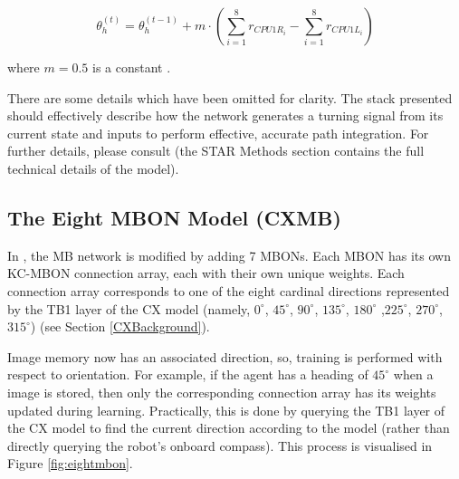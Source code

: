 \documentclass[a4paper,11pt,twoside,openright]{article}
\begin{document}
\begin{equation}
  \theta_h^{(t)} = \theta_h^{(t - 1)} +
  m \cdot (\sum_{i = 1}^{8} r_{CPU1R_{i}} - \sum_{i = 1}^{8} r_{CPU1L_{i}})
\end{equation}

where $m = 0.5$ is a constant \cite{Stone2017}.
\newline
\par

There are some details which have been omitted for clarity. The stack presented
should effectively describe how the network generates a turning signal from its
current state and inputs to perform effective, accurate path integration. For
further details, please consult \cite{Stone2017} (the STAR Methods section
contains the full technical details of the model).

\subsection{ The Eight MBON Model (CXMB) } \label{CXMBBackground}
In \cite{Zhang2017}, the MB network is modified by adding 7 MBONs. Each MBON has
its own KC-MBON connection array, each with their own unique weights. Each
connection array corresponds to one of the eight cardinal directions represented
by the TB1 layer of the CX model (namely, $0^{\circ}$, $45^{\circ}$,
$90^{\circ}$, $135^{\circ}$, $180^{\circ}$ ,$225^{\circ}$, $270^{\circ}$,
$315^{\circ}$) (see Section \ref{CXBackground}).
\newline
\par

Image memory now has an associated direction, so, training is performed with
respect to orientation. For example, if the agent has a heading of $45^{\circ}$
when a image is stored, then only the corresponding connection array has its
weights updated during learning. Practically, this is done by querying the TB1
layer of the CX model to find the current direction according to the model
(rather than directly querying the robot's onboard compass). This process is
visualised in Figure \ref{fig:eightmbon}.
\newline
\par
\end{document}
